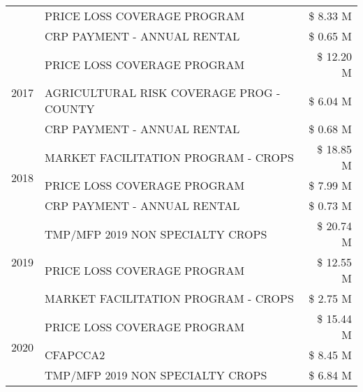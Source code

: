 \begin{tabular}{llr}
 & PRICE LOSS COVERAGE PROGRAM & \$ 8.33 M \\
 & CRP PAYMENT - ANNUAL RENTAL & \$ 0.65 M \\
\cline{1-3}
\multirow[t]{3}{*}{2017} & PRICE LOSS COVERAGE PROGRAM & \$ 12.20 M \\
 & AGRICULTURAL RISK COVERAGE PROG - COUNTY & \$ 6.04 M \\
 & CRP PAYMENT - ANNUAL RENTAL & \$ 0.68 M \\
\cline{1-3}
\multirow[t]{3}{*}{2018} & MARKET FACILITATION PROGRAM - CROPS & \$ 18.85 M \\
 & PRICE LOSS COVERAGE PROGRAM & \$ 7.99 M \\
 & CRP PAYMENT - ANNUAL RENTAL & \$ 0.73 M \\
\cline{1-3}
\multirow[t]{3}{*}{2019} & TMP/MFP 2019 NON SPECIALTY CROPS & \$ 20.74 M \\
 & PRICE LOSS COVERAGE PROGRAM & \$ 12.55 M \\
 & MARKET FACILITATION PROGRAM - CROPS & \$ 2.75 M \\
\cline{1-3}
\multirow[t]{3}{*}{2020} & PRICE LOSS COVERAGE PROGRAM & \$ 15.44 M \\
 & CFAPCCA2 & \$ 8.45 M \\
 & TMP/MFP 2019 NON SPECIALTY CROPS & \$ 6.84 M \\
\cline{1-3}
\bottomrule
\end{tabular}
